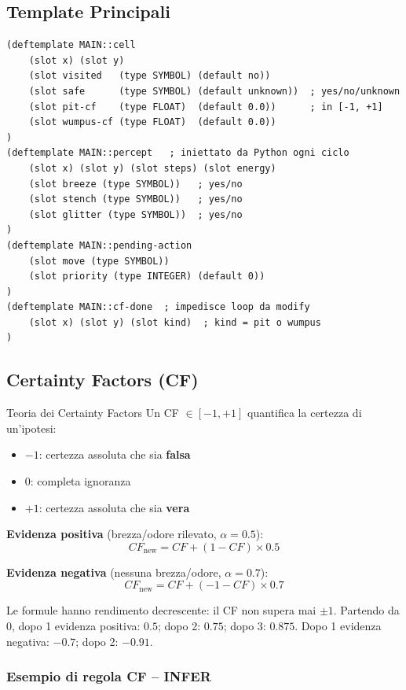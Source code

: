 \documentclass[12pt,a4paper]{article}
\begin{document}
\subsection{Template Principali}

\begin{lstlisting}[language=CLIPS]
(deftemplate MAIN::cell
    (slot x) (slot y)
    (slot visited   (type SYMBOL) (default no))
    (slot safe      (type SYMBOL) (default unknown))  ; yes/no/unknown
    (slot pit-cf    (type FLOAT)  (default 0.0))      ; in [-1, +1]
    (slot wumpus-cf (type FLOAT)  (default 0.0))
)
(deftemplate MAIN::percept   ; iniettato da Python ogni ciclo
    (slot x) (slot y) (slot steps) (slot energy)
    (slot breeze (type SYMBOL))   ; yes/no
    (slot stench (type SYMBOL))   ; yes/no
    (slot glitter (type SYMBOL))  ; yes/no
)
(deftemplate MAIN::pending-action
    (slot move (type SYMBOL))
    (slot priority (type INTEGER) (default 0))
)
(deftemplate MAIN::cf-done  ; impedisce loop da modify
    (slot x) (slot y) (slot kind)  ; kind = pit o wumpus
)
\end{lstlisting}

\subsection{Certainty Factors (CF)}

\begin{mathbox}{Teoria dei Certainty Factors}
Un CF $\in [-1, +1]$ quantifica la certezza di un'ipotesi:
\begin{itemize}[noitemsep]
  \item $-1$: certezza assoluta che sia \textbf{falsa}
  \item $0$: completa ignoranza
  \item $+1$: certezza assoluta che sia \textbf{vera}
\end{itemize}

\textbf{Evidenza positiva} (brezza/odore rilevato, $\alpha = 0.5$):
\[
  CF_{\text{new}} = CF + (1 - CF) \times 0.5
\]

\textbf{Evidenza negativa} (nessuna brezza/odore, $\alpha = 0.7$):
\[
  CF_{\text{new}} = CF + (-1 - CF) \times 0.7
\]

Le formule hanno rendimento decrescente: il CF non supera mai $\pm 1$.
Partendo da 0, dopo 1 evidenza positiva: $0.5$; dopo 2: $0.75$; dopo 3: $0.875$.
Dopo 1 evidenza negativa: $-0.7$; dopo 2: $-0.91$.
\end{mathbox}

\subsubsection{Esempio di regola CF -- INFER}
\end{document}

